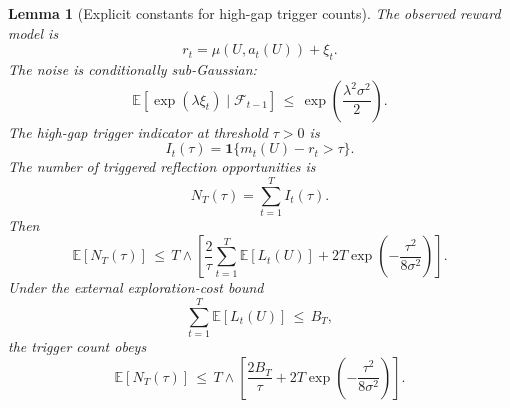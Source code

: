 \documentclass{article} %
\newtheorem{lemma}[theorem]{Lemma}
\begin{document}
\begin{lemma}[Explicit constants for high-gap trigger counts]
\label{lem:17}
The observed reward model is
\begin{equation}
\label{eq:app-six-trigger-reward}
r_t
=
\mu(U,a_t(U))+\xi_t.
\end{equation}
The noise is conditionally sub-Gaussian:
\begin{equation}
\label{eq:app-six-trigger-subg}
\mathbb{E}\!\left[\exp(\lambda \xi_t)\mid \mathcal{F}_{t-1}\right]
\,\le\,
\exp\!\left(\frac{\lambda^2\sigma^2}{2}\right).
\end{equation}
The high-gap trigger indicator at threshold \(\tau>0\) is
\begin{equation}
\label{eq:app-six-trigger-indicator}
I_t(\tau)
=
\mathbf{1}\{m_t(U)-r_t>\tau\}.
\end{equation}
The number of triggered reflection opportunities is
\begin{equation}
\label{eq:app-six-trigger-count}
N_T(\tau)
=
\sum_{t=1}^{T}I_t(\tau).
\end{equation}
Then
\begin{equation}
\label{eq:app-six-trigger-bound}
\mathbb{E}[N_T(\tau)]
\,\le\,
T
\wedge
\left[
\frac{2}{\tau}\sum_{t=1}^{T}\mathbb{E}[L_t(U)]
+
2T\exp\!\left(-\frac{\tau^2}{8\sigma^2}\right)
\right].
\end{equation}
Under the external exploration-cost bound
\begin{equation}
\label{eq:app-six-trigger-BT}
\sum_{t=1}^{T}\mathbb{E}[L_t(U)]\,\le\, B_T,
\end{equation}
the trigger count obeys
\begin{equation}
\label{eq:app-six-trigger-BT-bound}
\mathbb{E}[N_T(\tau)]
\,\le\,
T
\wedge
\left[
\frac{2B_T}{\tau}
+
2T\exp\!\left(-\frac{\tau^2}{8\sigma^2}\right)
\right].
\end{equation}
\end{lemma}
\end{document}
